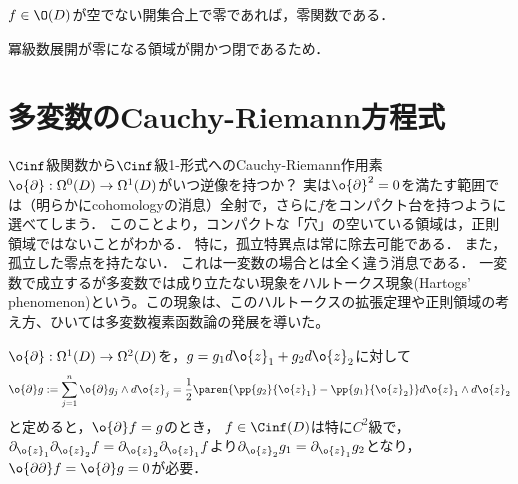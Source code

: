 \documentclass[uplatex, dvipdfmx]{jsreport}
\begin{document}
\begin{theorem}[一致の定理]\label{thm-identity-multivariable}
    $f\in\O(D)$が空でない開集合上で零であれば，零関数である．
\end{theorem}
\begin{Proof}
    冪級数展開が零になる領域が開かつ閉であるため．
\end{Proof}

\section{多変数のCauchy-Riemann方程式}

\begin{tcolorbox}[colframe=ForestGreen, colback=ForestGreen!10!white,breakable,colbacktitle=ForestGreen!40!white,coltitle=black,fonttitle=\bfseries\sffamily,
title=一変数と多変数で違うところ：Hartogs現象]
    $\Cinf$級関数から$\Cinf$級1-形式へのCauchy-Riemann作用素$\o{\partial}:\Omega^0(D)\to\Omega^1(D)$がいつ逆像を持つか？
    実は$\o{\partial}^2=0$を満たす範囲では（明らかにcohomologyの消息）全射で，さらに$f$をコンパクト台を持つように選べてしまう．
    このことより，コンパクトな「穴」の空いている領域は，正則領域ではないことがわかる．
    特に，孤立特異点は常に除去可能である．
    また，孤立した零点を持たない．
    これは一変数の場合とは全く違う消息である．
    一変数で成立するが多変数では成り立たない現象をハルトークス現象(Hartogs' phenomenon)という。この現象は、このハルトークスの拡張定理や正則領域の考え方、ひいては多変数複素函数論の発展を導いた。
\end{tcolorbox}

\begin{discussion}\label{discussion-CR-operator-in-mulivariable}
    $\o{\partial}:\Omega^1(D)\to\Omega^2(D)$を，$g=g_1d\o{z}_1+g_2d\o{z}_2$に対して
    \[\o{\partial}g:=\sum_{j=1}^n\o{\partial}g_j\wedge d\o{z}_j=\frac{1}{2}\paren{\pp{g_2}{\o{z}_1}-\pp{g_1}{\o{z}_2}}d\o{z}_1\wedge d\o{z}_2\]
    と定めると，$\o{\partial}f=g$のとき，
    $f\in\Cinf(D)$は特に$C^2$級で，
    $\partial_{\o{z}_1}\partial_{\o{z}_2}f=\partial_{\o{z}_2}\partial_{\o{z}_1}f$より$\partial_{\o{z}_2}g_1=\partial_{\o{z}_1}g_2$となり，$\o{\partial\partial}f=\o{\partial}g=0$が必要．
\end{discussion}
\end{document}
